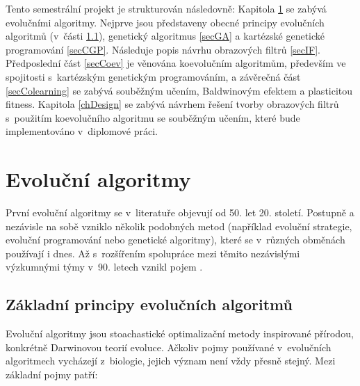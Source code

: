 Tento semestrální projekt je strukturován následovně: Kapitola \ref{chEA} se zabývá evolučními algoritmy. Nejprve jsou představeny obecné principy evolučních algoritmů (v~části \ref{secEAGeneral}), genetický algoritmus \ref{secGA} a kartézské genetické programování \ref{secCGP}. Následuje popis návrhu obrazových filtrů \ref{secIF}. Předposlední část \ref{secCoev} je věnována koevolučním algoritmům, především ve spojitosti s~kartézským genetickým programováním, a závěrečná část \ref{secColearning} se zabývá souběžným učením, Baldwinovým efektem a plasticitou fitness. Kapitola \ref{chDesign} se zabývá návrhem řešení tvorby obrazových filtrů s~použitím koevolučního algoritmu se souběžným učením, které bude implementováno v~diplomové práci.

\chapter{Evoluční algoritmy}
\label{chEA}

První evoluční algoritmy se v~literatuře objevují od 50. let 20. století. Postupně a nezávisle na sobě vzniklo několik podobných metod (například evoluční strategie, evoluční programování nebo genetické algoritmy), které se v~různých obměnách používají i dnes. Až s~rozšířením spolupráce mezi těmito nezávislými výzkumnými týmy v~90. letech vznikl pojem  \cite{Modra}.

\section{Základní principy evolučních algoritmů}
\label{secEAGeneral}

Evoluční algoritmy jsou stoachastické optimalizační metody inspirované přírodou, konkrétně Darwinovou teorií evoluce. Ačkoliv pojmy používané v~evolučních algoritmech vycházejí z~biologie, jejich význam není vždy přesně stejný. Mezi základní pojmy patří:

